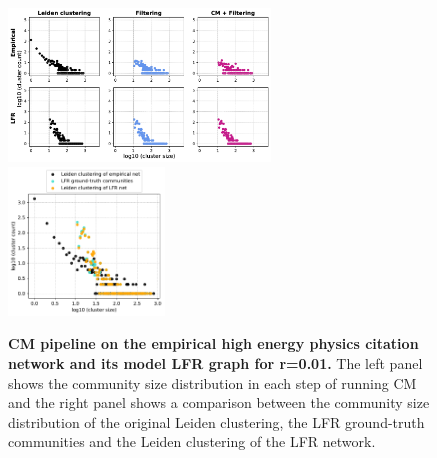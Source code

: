 \documentclass[a4paper]{article}   	%
\begin{document}
\begin{figure}[h!]
\centering
\includegraphics[width=0.62\textwidth]{figs/cit_hepph_cm_steps_lfr01.pdf}
\includegraphics[width=0.37\textwidth]{figs/cit_hepph_01_cm_size.pdf}
\caption[CM pipeline on the empirical high energy  physics citation network and its model LFR graph for r=0.01]{\textbf{CM pipeline on the empirical high energy physics citation network and its model LFR graph for r=0.01.} The left panel shows the community size distribution in each step of running CM and the right panel shows a comparison between the community size distribution of the original Leiden clustering, the LFR ground-truth communities and the Leiden clustering of the LFR network.}
\label{fig:hepph-cm-lfr-01}
\end{figure}
\end{document}
